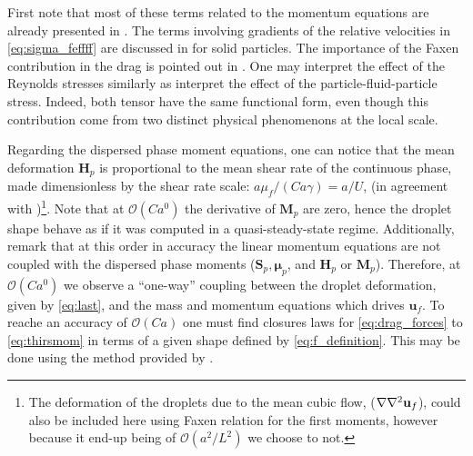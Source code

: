 First note that most of these terms related to the momentum equations are already presented in \citet[Appendix A]{zhang1997momentum}. 
The terms involving gradients of the relative velocities in \ref{eq:sigma_feffff} are discussed in \citet{nozieres1987local} for solid particles.  
The importance of the Faxen contribution in the drag is pointed out in \citet{Lhuillier_2009}. 
One may interpret the effect of the Reynolds stresses similarly as \citep{zhang2021ensemble,wang2021numerical} interpret the effect of the particle-fluid-particle stress. 
Indeed, both tensor have the same functional form, even though this contribution come from two distinct physical phenomenons at the local scale. 
 
Regarding the dispersed phase moment equations, one can notice that the mean deformation $\textbf{H}_p$ is proportional to the mean shear rate of the continuous phase, made dimensionless by the shear rate scale: $a \mu_f /(Ca \gamma)= a/U$, (in agreement with \citet{leal2007advanced})\footnote{The deformation of the droplets due to the mean cubic flow, ($\mathbf{\nabla}\mathbf{\nabla}^2\textbf{u}_f$), could also be included here using Faxen relation for the first moments, however because it end-up being of $\mathcal{O}(a^2/L^2)$ we choose to not. }.  
Note that at $\mathcal{O}(Ca^0)$ the derivative of $\textbf{M}_p$ are zero, hence the droplet shape behave as if it was computed in a quasi-steady-state regime.
Additionally, remark that at this order in accuracy the linear momentum equations are not coupled with the dispersed phase moments ($\textbf{S}_p,\bm\mu_p$, and $\textbf{H}_p$ or $\textbf{M}_p$).  
Therefore, at $\mathcal{O}(Ca^0)$ we observe a ``one-way'' coupling between the droplet deformation, given by \ref{eq:last}, and the mass and momentum equations which drives $\textbf{u}_f$. 
To reache an accuracy of $\mathcal{O}(Ca)$ one must find closures laws for \ref{eq:drag_forces} to \ref{eq:thirsmom} in terms of a given shape defined by \ref{eq:f_definition}. 
This may be done using the method provided by \cite{brenner1963stokes}. 


